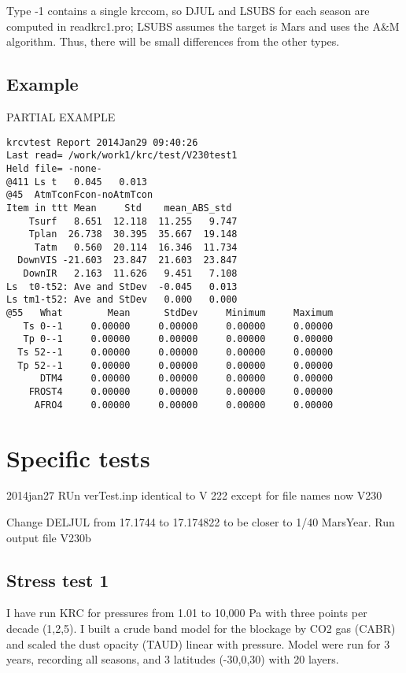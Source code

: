 \documentclass{article}  %
\begin{document}
Type -1 contains a single krccom, so DJUL and LSUBS for each season are computed in readkrc1.pro; LSUBS assumes the target is Mars and uses the A\&M algorithm. Thus, there will be small differences from the other types.

\subsection{Example} %
PARTIAL EXAMPLE
\vspace{-3.mm} 
\begin{verbatim}
krcvtest Report 2014Jan29 09:40:26
Last read= /work/work1/krc/test/V230test1
Held file= -none-
@411 Ls t   0.045   0.013
@45  AtmTconFcon-noAtmTcon
Item in ttt Mean     Std    mean_ABS_std
    Tsurf   8.651  12.118  11.255   9.747
    Tplan  26.738  30.395  35.667  19.148
     Tatm   0.560  20.114  16.346  11.734
  DownVIS -21.603  23.847  21.603  23.847
   DownIR   2.163  11.626   9.451   7.108
Ls  t0-t52: Ave and StDev  -0.045   0.013
Ls tm1-t52: Ave and StDev   0.000   0.000
@55   What        Mean      StdDev     Minimum     Maximum
   Ts 0--1     0.00000     0.00000     0.00000     0.00000
   Tp 0--1     0.00000     0.00000     0.00000     0.00000
  Ts 52--1     0.00000     0.00000     0.00000     0.00000
  Tp 52--1     0.00000     0.00000     0.00000     0.00000
      DTM4     0.00000     0.00000     0.00000     0.00000
    FROST4     0.00000     0.00000     0.00000     0.00000
     AFRO4     0.00000     0.00000     0.00000     0.00000
\end{verbatim}

\section{Specific tests}%

2014jan27 RUn verTest.inp identical to V 222 except for file names now V230

Change DELJUL from 17.1744 to 17.174822 to be closer to 1/40 MarsYear.
Run output file V230b

\subsection{Stress test 1}%

 I have run KRC for pressures from 1.01 to 10,000 Pa with three points per
 decade (1,2,5). I built a crude band model for the blockage by CO2 gas (CABR)
 and scaled the dust opacity (TAUD) linear with pressure. Model were run for 3
 years, recording all seasons, and 3 latitudes (-30,0,30) with 20 layers.
\end{document}
